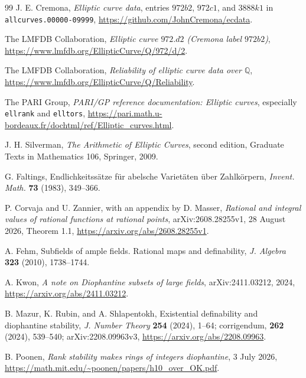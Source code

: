 \documentclass[11pt,a4paper]{article}
\theoremstyle{definition}
\newcommand{\Q}{\mathbb Q}\newcommand{\Z}{\mathbb Z}
\begin{document}
\begin{thebibliography}{99}
J. E. Cremona, \emph{Elliptic curve data}, entries $972b2$, $972c1$,
and $3888k1$ in \texttt{allcurves.00000-09999},
\url{https://github.com/JohnCremona/ecdata}.

The LMFDB Collaboration, \emph{Elliptic curve $972.d2$ (Cremona
label $972b2$)},
\url{https://www.lmfdb.org/EllipticCurve/Q/972/d/2}.

The LMFDB Collaboration, \emph{Reliability of elliptic curve data
over $\Q$},
\url{https://www.lmfdb.org/EllipticCurve/Q/Reliability}.

The PARI Group, \emph{PARI/GP reference documentation: Elliptic curves},
especially \texttt{ellrank} and \texttt{elltors},
\url{https://pari.math.u-bordeaux.fr/dochtml/ref/Elliptic_curves.html}.

J. H. Silverman, \emph{The Arithmetic of Elliptic Curves},
second edition, Graduate Texts in Mathematics 106,
Springer, 2009.

G. Faltings, Endlichkeitss\"atze f\"ur abelsche Variet\"aten
\"uber Zahlk\"orpern, \emph{Invent. Math.} \textbf{73} (1983),
349--366.

P. Corvaja and U. Zannier, with an appendix by D. Masser,
\emph{Rational and integral values of rational functions at rational
points}, arXiv:2608.28255v1, 28 August 2026, Theorem 1.1,
\url{https://arxiv.org/abs/2608.28255v1}.

A. Fehm, Subfields of ample fields. Rational maps and definability,
\emph{J. Algebra} \textbf{323} (2010), 1738--1744.

A. Kwon, \emph{A note on Diophantine subsets of large fields},
arXiv:2411.03212, 2024,
\url{https://arxiv.org/abs/2411.03212}.

B. Mazur, K. Rubin, and A. Shlapentokh,
Existential definability and diophantine stability,
\emph{J. Number Theory} \textbf{254} (2024), 1--64;
corrigendum, \textbf{262} (2024), 539--540;
arXiv:2208.09963v3,
\url{https://arxiv.org/abs/2208.09963}.

B. Poonen, \emph{Rank stability makes rings of integers diophantine},
3 July 2026,
\url{https://math.mit.edu/~poonen/papers/h10_over_OK.pdf}.
\end{thebibliography}
\end{document}
